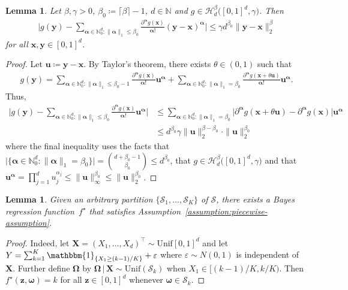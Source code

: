\documentclass[12pt]{article}
\newtheorem{lemma}[thm]{Lemma}
\begin{document}
\begin{lemma} \label{lemma:taylor-approximation-error}
    Let $\beta,\gamma>0$, $\beta_0 \coloneqq \lceil\beta\rceil - 1$, $d\in\mathbb{N}$ and $g\in \mathcal{H}_d^{\beta}\bigl([0,1]^d,\gamma\bigr)$. Then
    \begin{align*}
        \biggl| g(\bm y) - \sum_{\bm\alpha \in \mathbb{N}_0^d : \|\bm\alpha\|_1 \leq \beta_0} \frac{\partial^{\bm\alpha}g(\bm x)}{\bm\alpha!}(\bm y - \bm x)^{\bm\alpha} \biggr| \leq \gamma d^{\beta_0} \|\bm y - \bm x\|_2^{\beta}
    \end{align*}
    for all $\bm x,\bm y \in [0,1]^d$.
\end{lemma}
\begin{proof}
    Let $\bm u \coloneqq \bm y - \bm x$. By Taylor's theorem, there exists $\theta\in(0,1)$ such that
    \begin{align*}
        g(\bm y) = \sum_{\bm\alpha \in \mathbb{N}_0^d : \|\bm\alpha\|_1 \leq \beta_0-1} \frac{\partial^{\bm\alpha}g(\bm x)}{\bm\alpha!}\bm u^{\bm\alpha} + \sum_{\bm\alpha \in \mathbb{N}_0^d : \|\bm\alpha\|_1 = \beta_0} \frac{\partial^{\bm\alpha}g(\bm x + \theta\bm u)}{\bm\alpha!}\bm u^{\bm\alpha}.
    \end{align*}
    Thus,
    \begin{align*}
        \biggl| g(\bm y) - \sum_{\bm\alpha \in \mathbb{N}_0^d : \|\bm\alpha\|_1 \leq \beta_0} \frac{\partial^{\bm\alpha}g(\bm x)}{\bm\alpha!} \bm u^{\bm\alpha} \biggr| &\leq \sum_{\bm\alpha \in \mathbb{N}_0^d : \|\bm\alpha\|_1 = \beta_0} \bigl|\partial^{\bm\alpha}g(\bm x + \theta\bm u) - \partial^{\bm\alpha}g(\bm x)\bigr| \bm u^{\bm\alpha}\\
        &\leq d^{\beta_0} \gamma \|\bm u\|_2^{\beta-\beta_0}\cdot \|\bm u\|_2^{\beta_0}
    \end{align*}
    where the final inequality uses the facts that $\bigl|\{\bm\alpha \in \mathbb{N}_0^d : \|\bm\alpha\|_1 = \beta_0\}\bigr|= \binom{d+\beta_0-1}{\beta_0}\leq d^{\beta_0}$, that $g \in \mathcal{H}_d^{\beta}\bigl([0,1]^d,\gamma\bigr)$ and that $\bm u^{\bm\alpha} = \prod_{j=1}^d u_j^{\alpha_j} \leq \|\bm u\|_{\infty}^{\beta_0} \leq \|\bm u\|_2^{\beta_0}$.
\end{proof}

\begin{lemma}\label{lemma:arbitrary-partition}
    Given an arbitrary partition $\{\mathcal{S}_1,\ldots,\mathcal{S}_K\}$ of $\mathcal{S}$, there exists a Bayes regression function~$f^{\star}$ that satisfies Assumption~\ref{assumption:piecewise-assumption}.
\end{lemma}
\begin{proof}
    Indeed, let $\bm{X} = (X_1,\ldots,X_d)^\top \sim \mathrm{Unif}[0,1]^d$ and let $Y = \sum_{k=1}^K \mathbbm{1}_{\{X_{1}\geq (k-1)/K\}} + \varepsilon$ where $\varepsilon \sim N(0,1)$ is independent of $\bm X$. Further define $\bm \Omega$ by $\bm \Omega \,|\, \bm X \sim \mathrm{Unif}( \mathcal{S}_k)$ when $X_1 \in \bigl[(k-1)/K,k/K\bigr)$. Then $f^{\star}(\bm z,\bm \omega) = k$ for all $\bm z \in [0,1]^d$ whenever $\bm \omega\in\mathcal{S}_k$.
\end{proof}
\end{document}
